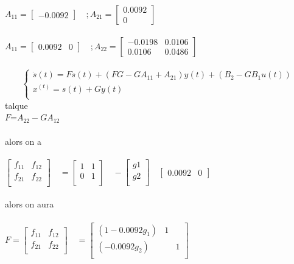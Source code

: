 $A_{11}=\begin{bmatrix}
-0.0092
\end{bmatrix}
\quad ;
A_{21}=\begin{bmatrix}
0.0092\\
0
\end{bmatrix}$\\\\


$A_{11}=\begin{bmatrix}
0.0092 & 0
\end{bmatrix}
\quad ;
A_{22}=\begin{bmatrix}
-0.0198 & 0.0106 \\
0.0106 & 0.0486
\end{bmatrix}$\\\\
 


\begin{equation}
\left\{\begin{matrix}
\dot{s}(t)=Fs(t)+(FG-GA_{11}+A_{21})y(t)+(B_{2}-GB_{1}u(t))\\
 x^(t)=s(t)+Gy(t)\\
\end{matrix}\right.
\end{equation}   
talque\\ 
$F$=$A_{22}-GA_{12}$\\\\
alors on a \\\\
$\begin{bmatrix}
f_{11} & f_{12}\\
f_{21} & f_{22}\\
\end{bmatrix}
\quad=
\begin{bmatrix}
1 & 1\\
0 & 1\\
\end{bmatrix}
\quad-
\begin{bmatrix}
g1\\
g2\\
\end{bmatrix}
\quad
\begin{bmatrix}
0.0092 & 0
\end{bmatrix}$\\\\

alors on aura \\\\
$F=
\begin{bmatrix}
f_{11} & f_{12}\\
f_{21} & f_{22}\\
\end{bmatrix}
\quad=
\begin{bmatrix}
(1-0.0092g_{1}) & 1\\
(-0.0092g_{2}) && 1\\
\end{bmatrix}$\\\\

